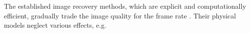 The established image recovery methods, which are
explicit and
computationally efficient, gradually trade
the image quality for
the frame rate
\cite{article:GarciaITUFFC2013,article:MontaldoITUFFC2009,article:JensenUlt2006,article:ChengITUFFC2006}.
Their physical models neglect
various effects, e.g.
